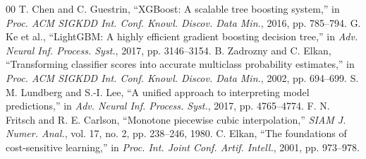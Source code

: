 \documentclass[conference]{IEEEtran}
\begin{document}
\begin{thebibliography}{00}
 T. Chen and C. Guestrin, ``XGBoost: A scalable tree boosting system,'' in \textit{Proc. ACM SIGKDD Int. Conf. Knowl. Discov. Data Min.}, 2016, pp. 785--794.
 G. Ke et al., ``LightGBM: A highly efficient gradient boosting decision tree,'' in \textit{Adv. Neural Inf. Process. Syst.}, 2017, pp. 3146--3154.
 B. Zadrozny and C. Elkan, ``Transforming classifier scores into accurate multiclass probability estimates,'' in \textit{Proc. ACM SIGKDD Int. Conf. Knowl. Discov. Data Min.}, 2002, pp. 694--699.
 S. M. Lundberg and S.-I. Lee, ``A unified approach to interpreting model predictions,'' in \textit{Adv. Neural Inf. Process. Syst.}, 2017, pp. 4765--4774.
 F. N. Fritsch and R. E. Carlson, ``Monotone piecewise cubic interpolation,'' \textit{SIAM J. Numer. Anal.}, vol. 17, no. 2, pp. 238--246, 1980.
 C. Elkan, ``The foundations of cost-sensitive learning,'' in \textit{Proc. Int. Joint Conf. Artif. Intell.}, 2001, pp. 973--978.
\end{thebibliography}
\end{document}
